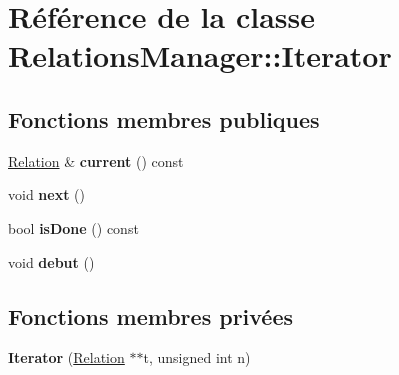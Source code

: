 \hypertarget{class_relations_manager_1_1_iterator}{\section{Référence de la classe Relations\-Manager\-:\-:Iterator}
\label{class_relations_manager_1_1_iterator}
}
\subsection*{Fonctions membres publiques}
\begin{DoxyCompactItemize}
\item 
\hypertarget{class_relations_manager_1_1_iterator_a93b25cf6f66311125ff6f0c38e16470f}{\hyperlink{class_relation}{Relation} \& {\bfseries current} () const }\label{class_relations_manager_1_1_iterator_a93b25cf6f66311125ff6f0c38e16470f}

\item 
\hypertarget{class_relations_manager_1_1_iterator_a4a70812b8235c40bcbdf90555da917a0}{void {\bfseries next} ()}\label{class_relations_manager_1_1_iterator_a4a70812b8235c40bcbdf90555da917a0}

\item 
\hypertarget{class_relations_manager_1_1_iterator_a3a8654bc558d4f5830ffbb194a519c4c}{bool {\bfseries is\-Done} () const }\label{class_relations_manager_1_1_iterator_a3a8654bc558d4f5830ffbb194a519c4c}

\item 
\hypertarget{class_relations_manager_1_1_iterator_a1d2e1532c4a7634531af829743fbf68c}{void {\bfseries debut} ()}\label{class_relations_manager_1_1_iterator_a1d2e1532c4a7634531af829743fbf68c}

\end{DoxyCompactItemize}
\subsection*{Fonctions membres privées}
\begin{DoxyCompactItemize}
\item 
\hypertarget{class_relations_manager_1_1_iterator_ac11a54b8303123f1a3c81a36cfb16480}{{\bfseries Iterator} (\hyperlink{class_relation}{Relation} $\ast$$\ast$t, unsigned int n)}\label{class_relations_manager_1_1_iterator_ac11a54b8303123f1a3c81a36cfb16480}

\end{DoxyCompactItemize}

